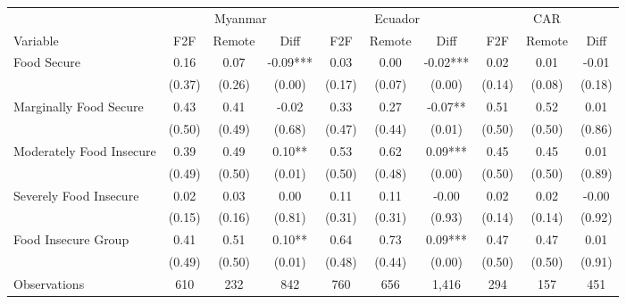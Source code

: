 \begin{tabular}{l*{9}c}
\hline\hline
 & \multicolumn{3}{c}{Myanmar} & \multicolumn{3}{c}{Ecuador} & \multicolumn{3}{c}{CAR}\\ 
Variable & F2F & Remote & Diff & F2F & Remote & Diff & F2F & Remote & Diff \\
\hline
Food Secure&0.16&0.07&-0.09***&0.03&0.00&-0.02***&0.02&0.01&-0.01\\
&(0.37)&(0.26)&(0.00)&(0.17)&(0.07)&(0.00)&(0.14)&(0.08)&(0.18)\\
Marginally Food Secure&0.43&0.41&-0.02&0.33&0.27&-0.07**&0.51&0.52&0.01\\
&(0.50)&(0.49)&(0.68)&(0.47)&(0.44)&(0.01)&(0.50)&(0.50)&(0.86)\\
Moderately Food Insecure&0.39&0.49&0.10**&0.53&0.62&0.09***&0.45&0.45&0.01\\
&(0.49)&(0.50)&(0.01)&(0.50)&(0.48)&(0.00)&(0.50)&(0.50)&(0.89)\\
Severely Food Insecure&0.02&0.03&0.00&0.11&0.11&-0.00&0.02&0.02&-0.00\\
&(0.15)&(0.16)&(0.81)&(0.31)&(0.31)&(0.93)&(0.14)&(0.14)&(0.92)\\
Food Insecure Group&0.41&0.51&0.10**&0.64&0.73&0.09***&0.47&0.47&0.01\\
&(0.49)&(0.50)&(0.01)&(0.48)&(0.44)&(0.00)&(0.50)&(0.50)&(0.91)\\
\hline
Observations & 610 & 232 & 842 & 760 & 656 & 1,416 & 294 & 157 & 451 \\
\hline\hline
\end{tabular}
